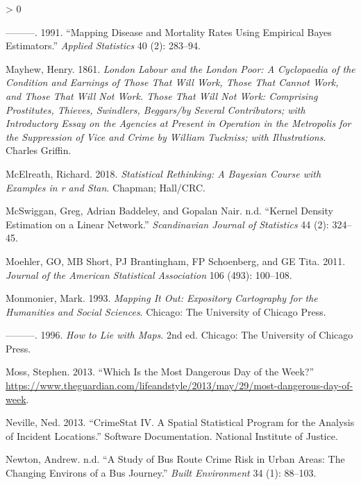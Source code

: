 \documentclass[
  krantz2]{krantz}
\newlength{\cslhangindent}
\newenvironment{CSLReferences}[2] %
 {%
  \setlength{\parindent}{0pt}
  \ifodd #1 \everypar{\setlength{\hangindent}{\cslhangindent}}\ignorespaces\fi
  \ifnum #2 > 0
  \setlength{\parskip}{#2\baselineskip}
  \fi
 }%
 {}
\begin{document}
\begin{CSLReferences}{1}{0}
\leavevmode\hypertarget{ref-Marshall_1991}{}%
---------. 1991. {``Mapping Disease and Mortality Rates Using Empirical Bayes Estimators.''} \emph{Applied Statistics} 40 (2): 283--94.

\leavevmode\hypertarget{ref-Mayhew_1861}{}%
Mayhew, Henry. 1861. \emph{London Labour and the London Poor: A Cyclopaedia of the Condition and Earnings of Those That Will Work, Those That Cannot Work, and Those That Will Not Work. Those That Will Not Work: Comprising Prostitutes, Thieves, Swindlers, Beggars/by Several Contributors; with Introductory Essay on the Agencies at Present in Operation in the Metropolis for the Suppression of Vice and Crime by William Tuckniss; with Illustrations}. Charles Griffin.

\leavevmode\hypertarget{ref-McElreath_2018}{}%
McElreath, Richard. 2018. \emph{Statistical Rethinking: A Bayesian Course with Examples in r and Stan}. Chapman; Hall/CRC.

\leavevmode\hypertarget{ref-McSwiggan_2016}{}%
McSwiggan, Greg, Adrian Baddeley, and Gopalan Nair. n.d. {``Kernel Density Estimation on a Linear Network.''} \emph{Scandinavian Journal of Statistics} 44 (2): 324--45.

\leavevmode\hypertarget{ref-Mohler_2011}{}%
Moehler, GO, MB Short, PJ Brantingham, FP Schoenberg, and GE Tita. 2011. \emph{Journal of the American Statistical Association} 106 (493): 100--108.

\leavevmode\hypertarget{ref-Monmonier_1993}{}%
Monmonier, Mark. 1993. \emph{Mapping It Out: Expository Cartography for the Humanities and Social Sciences}. Chicago: The University of Chicago Press.

\leavevmode\hypertarget{ref-Monmonier_1996}{}%
---------. 1996. \emph{How to Lie with Maps}. 2nd ed. Chicago: The University of Chicago Press.

\leavevmode\hypertarget{ref-Moss_2013}{}%
Moss, Stephen. 2013. {``Which Is the Most Dangerous Day of the Week?''} \url{https://www.theguardian.com/lifeandstyle/2013/may/29/most-dangerous-day-of-week}.

\leavevmode\hypertarget{ref-Neville_2013}{}%
Neville, Ned. 2013. {``CrimeStat IV. A Spatial Statistical Program for the Analysis of Incident Locations.''} Software Documentation. National Institute of Justice.

\leavevmode\hypertarget{ref-Newton_2008}{}%
Newton, Andrew. n.d. {``A Study of Bus Route Crime Risk in Urban Areas: The Changing Environs of a Bus Journey.''} \emph{Built Environment} 34 (1): 88--103.


\end{CSLReferences}
\end{document}
